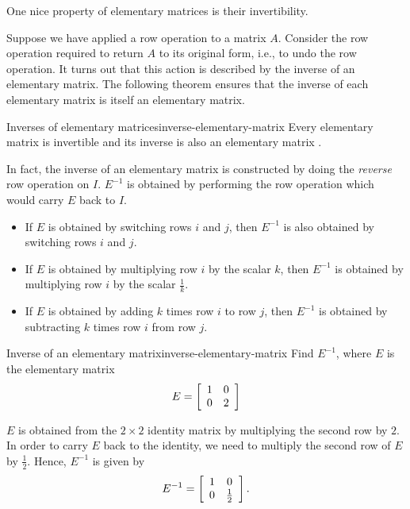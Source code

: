 \documentclass{ximera}
\begin{document}
One nice property of elementary matrices is their invertibility.

Suppose we have applied a row operation to a matrix $A$. Consider the
row operation required to return $A$ to its original form, i.e., to
undo the row operation. It turns out that this action is described by
the inverse of an elementary matrix. The following theorem ensures
that the inverse of each elementary matrix is itself an elementary
matrix.

\begin{theorem}{Inverses of elementary matrices}{inverse-elementary-matrix}
  Every elementary matrix is invertible and its inverse is also an
  elementary matrix%
  .
\end{theorem}

In fact, the inverse of an elementary matrix is constructed by doing
the {\em reverse} row operation on $I$. $E^{-1}$ is obtained by
performing the row operation which would carry $E$ back to $I$.

\begin{itemize}
\item If $E$ is obtained by switching rows $i$ and $j$, then $E^{-1}$
  is also obtained by switching rows $i$ and $j$.
\item If $E$ is obtained by multiplying row $i$ by the scalar $k$,
  then $E^{-1}$ is obtained by multiplying row $i$ by the scalar
  $\frac{1}{k}$.
\item If $E$ is obtained by adding $k$ times row $i$ to row $j$, then
  $E^{-1}$ is obtained by subtracting $k$ times row $i$ from row $j$.
\end{itemize}

\begin{example}{Inverse of an elementary matrix}{inverse-elementary-matrix}
  Find $E^{-1}$, where $E$ is the elementary matrix
  \begin{equation*}
    E
    =
    \startmat{cc}
      1 & 0 \\
      0 & 2
    \stopmat
  \end{equation*}
\end{example}

\begin{solution}
  $E$ is obtained from the $2\times 2$ identity matrix by multiplying
  the second row by $2$. In order to carry $E$ back to the identity,
  we need to multiply the second row of $E$ by $\frac{1}{2}$.  Hence,
  $E^{-1}$ is given by
  \begin{equation*}
    E^{-1}
    =
    \startmat{cc}
      1 & 0 \\
      0 & \frac{1}{2}
    \stopmat.
  \end{equation*}
\end{solution}
 
\end{document}
